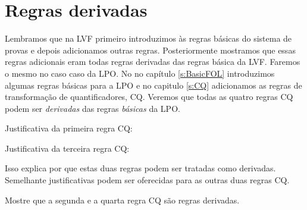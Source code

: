 \chapter{Regras derivadas}\label{s:DerivedFOL}
Lembramos que na LVF  primeiro introduzimos \`as regras b\'asicas do sistema de provas  e depois adicionamos outras regras.  Posteriormente mostramos que essas regras adicionais eram todas regras derivadas das regras b\'asica da LVF.  Faremos o mesmo no caso caso da LPO.  No no cap\'itulo \ref{s:BasicFOL} introduzimos algumas regras b\'asicas para a LPO e no capitulo \ref{s:CQ} adicionamos  as  regras de transforma\c c\~ao de quantificadores, CQ.  Veremos que todas as quatro regras CQ podem ser \emph{derivadas} das regras \emph{b\'asicas} da LPO.  

Justificativa da primeira regra CQ:
\begin{fitchproof}
	\open
		\open
		\close
	\close
\end{fitchproof}
Justificativa da terceira regra CQ:
   
\begin{fitchproof}
	\open
		\open
		\close
	\close
\end{fitchproof}
Isso explica por que estas duas regras podem ser tratadas como derivadas. Semelhante justificativas podem ser oferecidas para as outras duas regras CQ.

\practiceproblems

\problempart
Mostre que a segunda e a quarta regra  CQ s\~ao regras derivadas.

